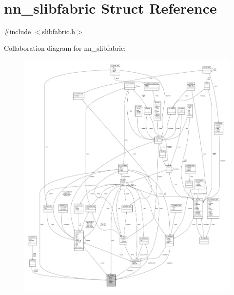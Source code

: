 \hypertarget{structnn__slibfabric}{}\section{nn\+\_\+slibfabric Struct Reference}
\label{structnn__slibfabric}


{\ttfamily \#include $<$slibfabric.\+h$>$}



Collaboration diagram for nn\+\_\+slibfabric\+:\nopagebreak
\begin{figure}[H]
\begin{center}
\leavevmode
\includegraphics[width=350pt]{structnn__slibfabric__coll__graph}
\end{center}
\end{figure}
